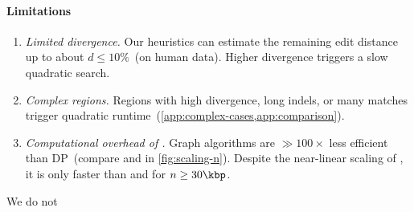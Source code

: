 \paragraph{Limitations} \phantom{x}
\nopagebreaklist

\begin{enumerate}
  \item \emph{Limited divergence.} %
        Our heuristics can estimate the remaining edit distance up to about
        $d{\leq}10\%$~(on human data). Higher divergence triggers a slow
        quadratic search.
  \item \emph{Complex regions.} %
        Regions with high divergence, long indels, or many matches trigger
        quadratic runtime~(\cref{app:complex-cases,app:comparison}).
  \item \emph{Computational overhead of \A.} %
        Graph algorithms are ${\gg} 100\times$ less efficient than DP~(compare
        \dijkstra and \edlib in \cref{fig:scaling-n}). Despite the near-linear
        scaling of \astarpa, it is only faster than \edlib and \wfa for $n \geq 30\kbp$.
\end{enumerate}

We do not 